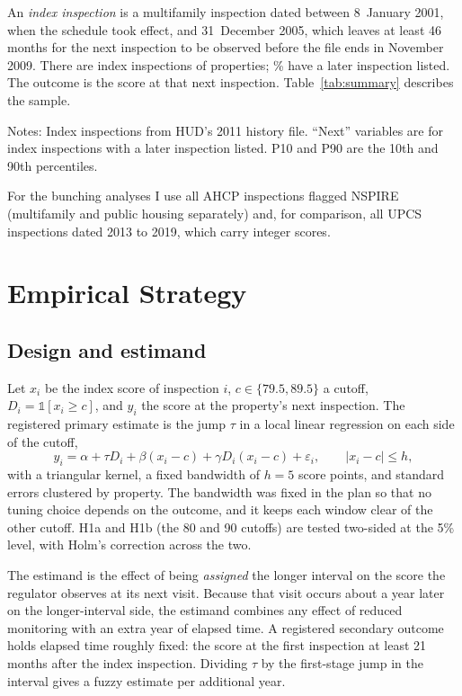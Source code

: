\documentclass[11pt,letterpaper]{article}
\begin{document}
An \emph{index inspection} is a multifamily inspection dated between 8~January 2001, when the schedule took effect, and 31~December 2005, which leaves at least 46 months for the next inspection to be observed before the file ends in November 2009. There are \nIndex{} index inspections of \nIndexProps{} properties; \shareNext\% have a later inspection listed. The outcome is the score at that next inspection. Table~\ref{tab:summary} describes the sample.

\begin{table}[t]
\centering\small
\caption{Primary sample: multifamily index inspections, 2001--2005}\label{tab:summary}

\par\vspace{0.5ex}\footnotesize\raggedright Notes: Index inspections from HUD's 2011 history file. ``Next'' variables are for index inspections with a later inspection listed. P10 and P90 are the 10th and 90th percentiles.
\end{table}

For the bunching analyses I use all AHCP inspections flagged NSPIRE (multifamily and public housing separately) and, for comparison, all UPCS inspections dated 2013 to 2019, which carry integer scores.

\section{Empirical Strategy}\label{sec:strategy}
\subsection{Design and estimand}
Let $x_i$ be the index score of inspection $i$, $c\in\{79.5, 89.5\}$ a cutoff, $D_i=\mathbb{1}[x_i\ge c]$, and $y_i$ the score at the property's next inspection. The registered primary estimate is the jump $\tau$ in a local linear regression on each side of the cutoff,
\begin{equation}
y_i=\alpha+\tau D_i+\beta(x_i-c)+\gamma D_i(x_i-c)+\varepsilon_i,\qquad |x_i-c|\le h,
\end{equation}
with a triangular kernel, a fixed bandwidth of $h=5$ score points, and standard errors clustered by property. The bandwidth was fixed in the plan so that no tuning choice depends on the outcome, and it keeps each window clear of the other cutoff. H1a and H1b (the 80 and 90 cutoffs) are tested two-sided at the 5\% level, with Holm's correction across the two.

The estimand is the effect of being \emph{assigned} the longer interval on the score the regulator observes at its next visit. Because that visit occurs about a year later on the longer-interval side, the estimand combines any effect of reduced monitoring with an extra year of elapsed time. A registered secondary outcome holds elapsed time roughly fixed: the score at the first inspection at least 21 months after the index inspection. Dividing $\tau$ by the first-stage jump in the interval gives a fuzzy estimate per additional year.
\end{document}
